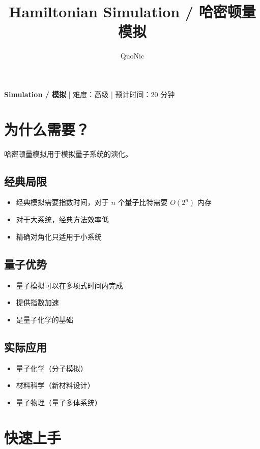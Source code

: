 \documentclass[12pt,a4paper]{article}
\title{Hamiltonian Simulation / 哈密顿量模拟}
\author{QuoNic}
\date{}
\begin{document}
\maketitle

\begin{center}
\textbf{Simulation / 模拟} | 难度：高级 | 预计时间：20 分钟
\end{center}

\tableofcontents
\newpage

\section{为什么需要？}

哈密顿量模拟用于模拟量子系统的演化。

\subsection{经典局限}
\begin{itemize}
  \item 经典模拟需要指数时间，对于 $n$ 个量子比特需要 $O(2^n)$ 内存
  \item 对于大系统，经典方法效率低
  \item 精确对角化只适用于小系统
\end{itemize}

\subsection{量子优势}
\begin{itemize}
  \item 量子模拟可以在多项式时间内完成
  \item 提供指数加速
  \item 是量子化学的基础
\end{itemize}

\subsection{实际应用}
\begin{itemize}
  \item 量子化学（分子模拟）
  \item 材料科学（新材料设计）
  \item 量子物理（量子多体系统）
\end{itemize}

\section{快速上手}
\end{document}
